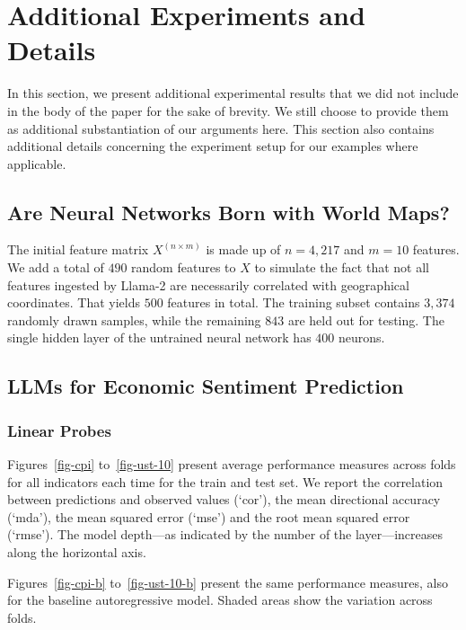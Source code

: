 \twocolumn

\section{Additional Experiments and Details}\label{appendix:autoencoder}

In this section, we present additional experimental results that we did not include in the body of the paper for the sake of brevity. We still choose to provide them as additional substantiation of our arguments here. This section also contains additional details concerning the experiment setup for our examples where applicable. 

\subsection{Are Neural Networks Born with World Maps?}

The initial feature matrix \(X^{(n \times m)}\) is made up of \(n=4,217\) and \(m=10\) features.  We add a total of \(490\) random features to \(X\) to simulate the fact that not all features ingested by Llama-2 are necessarily correlated with geographical coordinates. That yields \(500\) features in total. The training subset contains \(3,374\) randomly drawn samples, while the remaining \(843\) are held out for testing. The single hidden layer of the untrained neural network has \(400\) neurons.

\subsection{LLMs for Economic Sentiment Prediction}

\subsubsection{Linear Probes}

Figures~\ref{fig-cpi} to~\ref{fig-ust-10} present average performance measures across folds for all indicators each time for the train and test set. We report the correlation between predictions and observed values (`cor'), the mean directional accuracy (`mda'), the mean squared error (`mse') and the root mean squared error (`rmse'). The model depth---as indicated by the number of the layer---increases along the horizontal axis.

Figures~\ref{fig-cpi-b} to~\ref{fig-ust-10-b} present the same performance measures, also for the baseline autoregressive model. Shaded areas show the variation across folds.

